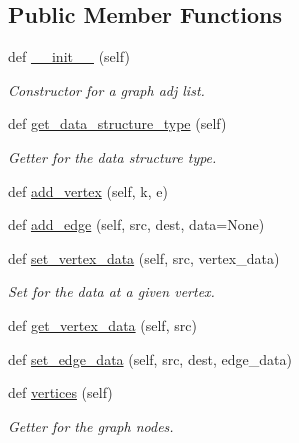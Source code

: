 \subsection*{Public Member Functions}
\begin{DoxyCompactItemize}
\item 
def \mbox{\hyperlink{classbridges_1_1graph__adj__list_1_1_graph_adj_list_a8258a38ef234f4140b971e9fb7be7784}{\+\_\+\+\_\+init\+\_\+\+\_\+}} (self)
\begin{DoxyCompactList}\small\item\em Constructor for a graph adj list. \end{DoxyCompactList}\item 
def \mbox{\hyperlink{classbridges_1_1graph__adj__list_1_1_graph_adj_list_afe3d470247e6b64f38c0d5d51dece920}{get\+\_\+data\+\_\+structure\+\_\+type}} (self)
\begin{DoxyCompactList}\small\item\em Getter for the data structure type. \end{DoxyCompactList}\item 
def \mbox{\hyperlink{classbridges_1_1graph__adj__list_1_1_graph_adj_list_a5e8ecd31b5ebdee85e4b35e89335e129}{add\+\_\+vertex}} (self, k, e)
\item 
def \mbox{\hyperlink{classbridges_1_1graph__adj__list_1_1_graph_adj_list_aa3f026bb5116f3816dad7ff0c193ee40}{add\+\_\+edge}} (self, src, dest, data=None)
\item 
def \mbox{\hyperlink{classbridges_1_1graph__adj__list_1_1_graph_adj_list_a7b4669b353a04f6868710c22790bd263}{set\+\_\+vertex\+\_\+data}} (self, src, vertex\+\_\+data)
\begin{DoxyCompactList}\small\item\em Set for the data at a given vertex. \end{DoxyCompactList}\item 
def \mbox{\hyperlink{classbridges_1_1graph__adj__list_1_1_graph_adj_list_a0523e2e842042c131dcbe4fd66a6a296}{get\+\_\+vertex\+\_\+data}} (self, src)
\item 
def \mbox{\hyperlink{classbridges_1_1graph__adj__list_1_1_graph_adj_list_aa1b179f2d1ded0135afa792278f3a500}{set\+\_\+edge\+\_\+data}} (self, src, dest, edge\+\_\+data)
\item 
def \mbox{\hyperlink{classbridges_1_1graph__adj__list_1_1_graph_adj_list_ae41cb9193582a782d4880b18085fc1c6}{vertices}} (self)
\begin{DoxyCompactList}\small\item\em Getter for the graph nodes. \end{DoxyCompactList}\item 

\end{DoxyCompactItemize}
